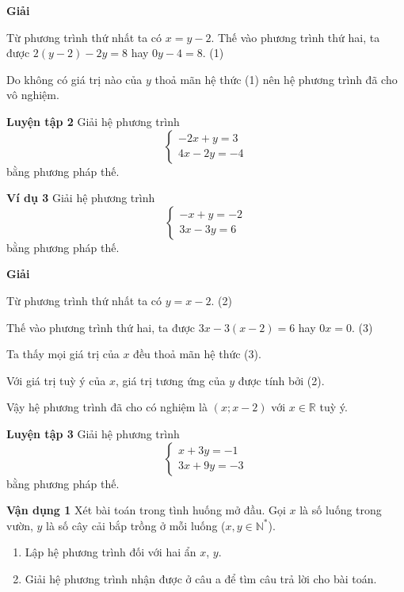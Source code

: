 \begin{lesson}
    \textbf{Giải}

    Từ phương trình thứ nhất ta có $x=y-2$. Thế vào phương trình thứ hai, ta được $2(y-2)-2y=8$ hay $0y-4=8$. \hfill (1)

    Do không có giá trị nào của $y$ thoả mãn hệ thức (1) nên hệ phương trình đã cho vô nghiệm.

    \textbf{Luyện tập 2} Giải hệ phương trình
    \[
        \begin{cases}
            -2x+y=3\\
            4x-2y=-4
        \end{cases}
    \]
    bằng phương pháp thế.

    \answerline
    \answerline
    \answerline

    \textbf{Ví dụ 3} Giải hệ phương trình
    \[
        \begin{cases}
            -x+y=-2\\
            3x-3y=6
        \end{cases}
    \]
    bằng phương pháp thế.

    \textbf{Giải}

    Từ phương trình thứ nhất ta có $y=x-2$. \hfill (2)

    Thế vào phương trình thứ hai, ta được $3x-3(x-2)=6$ hay $0x=0$. \hfill (3)

    Ta thấy mọi giá trị của $x$ đều thoả mãn hệ thức (3).

    Với giá trị tuỳ ý của $x$, giá trị tương ứng của $y$ được tính bởi (2).

    Vậy hệ phương trình đã cho có nghiệm là $(x;x-2)$ với $x\in\mathbb{R}$ tuỳ ý.

    \textbf{Luyện tập 3} Giải hệ phương trình
    \[
        \begin{cases}
            x+3y=-1\\
            3x+9y=-3
        \end{cases}
    \]
    bằng phương pháp thế.

    \answerline
    \answerline
    \answerline

    \textbf{Vận dụng 1} Xét bài toán trong tình huống mở đầu. Gọi $x$ là số luống trong vườn, $y$ là số cây cải bắp trồng ở mỗi luống ($x,y\in\mathbb{N}^{*}$).
    \begin{enumerate}[label=\alph*)]
        \item Lập hệ phương trình đối với hai ẩn $x$, $y$.
        \item Giải hệ phương trình nhận được ở câu a để tìm câu trả lời cho bài toán.
    \end{enumerate}


\end{lesson}
